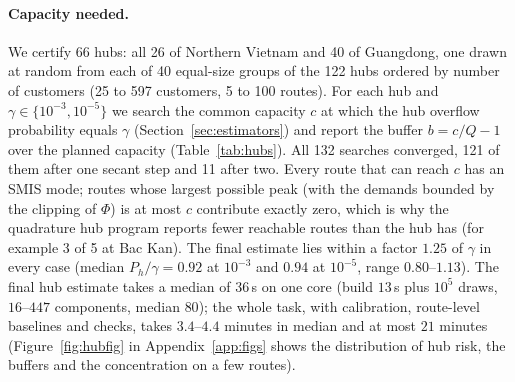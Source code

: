 \documentclass[ijoc,sglanonrev]{informs4}
\begin{document}
\begin{table}[t]
\centering\small
\caption{Plans at their planned capacity $Q$: share of routes with overflow
probability at most $\gamma$ (route SMIS), and the overflow probability of a
hub, by region (148 hubs, 6\,242 routes). No hub passes at any $\gamma$.}
\label{tab:pass}
\end{table}

\paragraph{Capacity needed.} We certify 66 hubs: all 26 of Northern Vietnam and 40 of Guangdong,
one drawn at random from each of 40 equal-size groups of the 122 hubs ordered
by number of customers (25 to 597 customers, 5 to 100 routes). For each hub
and $\gamma\in\{10^{-3},10^{-5}\}$ we search the common capacity $c$ at which
the hub overflow probability equals $\gamma$ (Section~\ref{sec:estimators})
and report the buffer $b=c/Q-1$ over the planned capacity
(Table~\ref{tab:hubs}). All 132 searches converged, 121 of them after one
secant step and 11 after two. Every route that can reach $c$ has an SMIS mode; routes whose largest possible peak (with the demands bounded by the clipping of $\Phi$) is at most $c$ contribute exactly zero, which is why the quadrature hub program reports fewer reachable routes than the hub has (for example 3 of 5 at Bac Kan). The final estimate lies within a
factor $1.25$ of $\gamma$ in every case (median $P_h/\gamma=0.92$ at $10^{-3}$
and $0.94$ at $10^{-5}$, range $0.80$--$1.13$). The final hub estimate takes
a median of $36$\,s on one core (build $13$\,s plus $10^5$ draws, $16$--$447$ components, median $80$); the
whole task, with calibration, route-level baselines and checks, takes
$3.4$--$4.4$ minutes in median and at most $21$ minutes (Figure~\ref{fig:hubfig} in Appendix~\ref{app:figs} shows the distribution of hub risk, the buffers and the concentration on a few routes).
\end{document}
